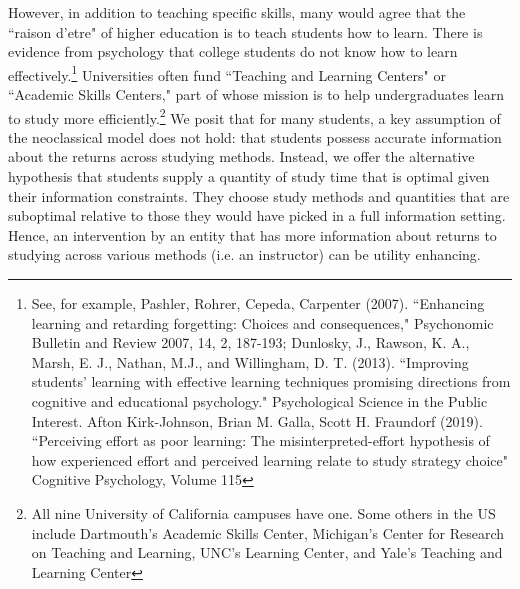 \documentclass[12pt]{article}
\begin{document}
However, in addition to teaching specific skills, many would agree that the ``raison d'etre" of higher education is to teach students how to learn. There is evidence from psychology that college students do not know how to learn effectively.\footnote{See, for example, Pashler, Rohrer, Cepeda, Carpenter (2007). ``Enhancing learning and retarding forgetting: Choices and consequences," Psychonomic Bulletin and Review 2007, 14, 2, 187-193; Dunlosky, J., Rawson, K. A., Marsh, E. J., Nathan, M.J., and Willingham, D. T. (2013). ``Improving students’ learning with effective learning techniques promising directions from cognitive and educational psychology." Psychological Science in the Public Interest. Afton Kirk-Johnson, Brian M. Galla, Scott H. Fraundorf (2019). ``Perceiving effort as poor learning: The misinterpreted-effort hypothesis of how experienced effort and perceived learning relate to study strategy choice" Cognitive Psychology, Volume 115} Universities often fund ``Teaching and Learning Centers" or ``Academic Skills Centers," part of whose mission is to help undergraduates learn to study more efficiently.\footnote{All nine University of California campuses have one. Some others in the US include Dartmouth's Academic Skills Center, Michigan's Center for Research on Teaching and Learning, UNC's Learning Center, and Yale's Teaching and Learning Center} We posit that for many students, a key assumption of the neoclassical model does not hold: that students possess accurate information about the returns across studying methods. Instead, we offer the alternative hypothesis that students supply a quantity of study time that is optimal given their information constraints. They choose study methods and quantities that are suboptimal relative to those they would have picked in a full information setting. Hence, an intervention by an entity that has more information about returns to studying across various methods (i.e. an instructor) can be utility enhancing. 
\end{document}
